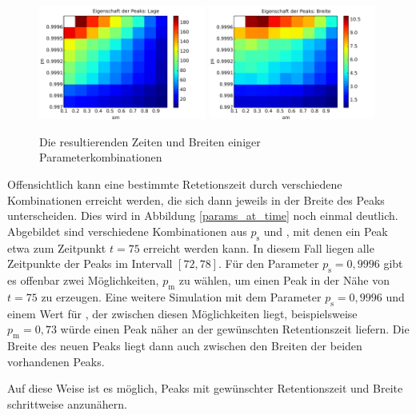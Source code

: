 \begin{figure}[h]
\includegraphics[width=0.49\textwidth]{bilder/erreichbare_Zeiten_2s}
\includegraphics[width=0.49\textwidth]{bilder/erreichbare_Breiten_2s}
\caption{Die resultierenden Zeiten und Breiten einiger Parameterkombinationen}
\label{heatmap_lage_breite}
\end{figure}

Offensichtlich kann eine bestimmte Retetionszeit durch verschiedene Kombinationen erreicht werden, die sich dann jeweils in der Breite des Peaks unterscheiden. Dies wird in Abbildung \ref{params_at_time} noch einmal deutlich. Abgebildet sind verschiedene Kombinationen aus $p_{\text{s}}$ und \pm, mit denen ein Peak etwa zum Zeitpunkt $t=75$ erreicht werden kann. In diesem Fall liegen alle Zeitpunkte der Peaks im Intervall $[72, 78]$. Für den Parameter $p_{\text{s}} = 0,9996$ gibt es offenbar zwei Möglichkeiten, $p_{\text{m}}$ zu wählen, um einen Peak in der Nähe von $t = 75$ zu erzeugen. Eine weitere Simulation mit dem Parameter $p_{\text{s}} = 0,9996$ und einem Wert für \pm, der zwischen diesen Möglichkeiten liegt, beispielsweise $p_{\text{m}} = 0,73$ würde einen Peak näher an der gewünschten Retentionszeit liefern. Die Breite des neuen Peaks liegt dann auch zwischen den Breiten der beiden vorhandenen Peaks.

Auf diese Weise ist es möglich, Peaks mit gewünschter Retentionszeit und Breite schrittweise anzunähern. 

